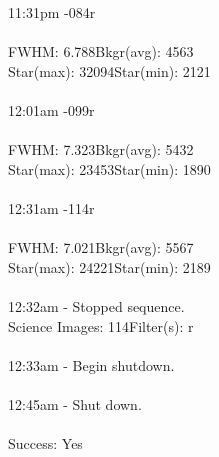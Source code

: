 \documentclass[11pt]{report}
\begin{document}
11:31pm -\hspace{97pt}084r \\ \\
FWHM: 6.788\hspace{70pt}Bkgr(avg): 4563 \\
Star(max): 32094\hspace{55pt}Star(min): 2121\\ \\
12:01am -\hspace{97pt}099r \\ \\
FWHM: 7.323\hspace{70pt}Bkgr(avg): 5432 \\
Star(max): 23453\hspace{55pt}Star(min): 1890\\ \\
12:31am -\hspace{97pt}114r \\ \\
FWHM: 7.021\hspace{70pt}Bkgr(avg): 5567 \\
Star(max): 24221\hspace{55pt}Star(min): 2189\\ \\
12:32am - Stopped sequence. \\
Science Images: 114\hspace{97pt}Filter(s): r \\ \\
12:33am - Begin shutdown. \\ \\
12:45am - Shut down. \\ \\
Success: Yes
\end{document}
